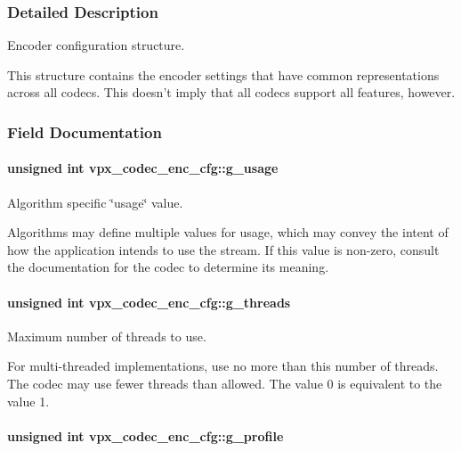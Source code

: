 \subsubsection{Detailed Description}
Encoder configuration structure. 

This structure contains the encoder settings that have common representations across all codecs. This doesn't imply that all codecs support all features, however. 

\subsubsection{Field Documentation}
\hypertarget{structvpx__codec__enc__cfg_a5bcf7fc1efc4890de351e3c6fe252355}{
\paragraph[{g\-\_\-usage}]{\setlength{\rightskip}{0pt plus 5cm}unsigned int vpx\-\_\-codec\-\_\-enc\-\_\-cfg\-::g\-\_\-usage}}\label{structvpx__codec__enc__cfg_a5bcf7fc1efc4890de351e3c6fe252355}


Algorithm specific \char`\"{}usage\char`\"{} value. 

Algorithms may define multiple values for usage, which may convey the intent of how the application intends to use the stream. If this value is non-\/zero, consult the documentation for the codec to determine its meaning. \hypertarget{structvpx__codec__enc__cfg_aff9d8d458c45c95dd542603210ba2b8b}{
\paragraph[{g\-\_\-threads}]{\setlength{\rightskip}{0pt plus 5cm}unsigned int vpx\-\_\-codec\-\_\-enc\-\_\-cfg\-::g\-\_\-threads}}\label{structvpx__codec__enc__cfg_aff9d8d458c45c95dd542603210ba2b8b}


Maximum number of threads to use. 

For multi-\/threaded implementations, use no more than this number of threads. The codec may use fewer threads than allowed. The value 0 is equivalent to the value 1. \hypertarget{structvpx__codec__enc__cfg_a3d7fe3a8b237338c094d5a956a41804d}{
\paragraph[{g\-\_\-profile}]{\setlength{\rightskip}{0pt plus 5cm}unsigned int vpx\-\_\-codec\-\_\-enc\-\_\-cfg\-::g\-\_\-profile}}\label{structvpx__codec__enc__cfg_a3d7fe3a8b237338c094d5a956a41804d}


